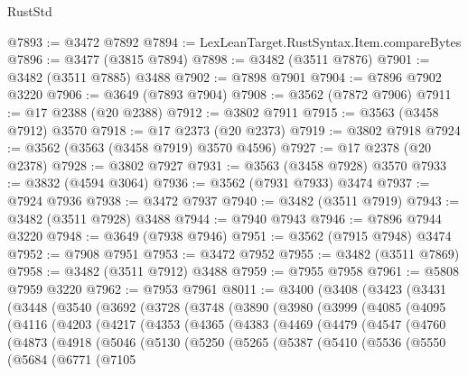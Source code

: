 \begin{lexlean}{RustStd}
\begin{coremodule}
@7893 := @3472 @7892
@7894 := LexLeanTarget.RustSyntax.Item.compareBytes
@7896 := @3477 (@3815 @7894)
@7898 := @3482 (@3511 @7876)
@7901 := @3482 (@3511 @7885) @3488
@7902 := @7898 @7901
@7904 := @7896 @7902 @3220
@7906 := @3649 (@7893 @7904)
@7908 := @3562 (@7872 @7906)
@7911 := @17 @2388 (@20 @2388)
@7912 := @3802 @7911
@7915 := @3563 (@3458 @7912) @3570
@7918 := @17 @2373 (@20 @2373)
@7919 := @3802 @7918
@7924 := @3562 (@3563 (@3458 @7919) @3570 @4596)
@7927 := @17 @2378 (@20 @2378)
@7928 := @3802 @7927
@7931 := @3563 (@3458 @7928) @3570
@7933 := @3832 (@4594 @3064)
@7936 := @3562 (@7931 @7933) @3474
@7937 := @7924 @7936
@7938 := @3472 @7937
@7940 := @3482 (@3511 @7919)
@7943 := @3482 (@3511 @7928) @3488
@7944 := @7940 @7943
@7946 := @7896 @7944 @3220
@7948 := @3649 (@7938 @7946)
@7951 := @3562 (@7915 @7948) @3474
@7952 := @7908 @7951
@7953 := @3472 @7952
@7955 := @3482 (@3511 @7869)
@7958 := @3482 (@3511 @7912) @3488
@7959 := @7955 @7958
@7961 := @5808 @7959 @3220
@7962 := @7953 @7961
@8011 := @3400
    (@3408
      (@3423
        (@3431
          (@3448
            (@3540
              (@3692
                (@3728
                  (@3748
                    (@3890
                      (@3980
                        (@3999
                          (@4085
                            (@4095
                              (@4116
                                (@4203
                                  (@4217
                                    (@4353
                                      (@4365
                                        (@4383
                                          (@4469
                                            (@4479
                                              (@4547
                                                (@4760
                                                  (@4873
                                                    (@4918
                                                      (@5046
                                                        (@5130
                                                          (@5250
                                                            (@5265
                                                              (@5387
                                                                (@5410
                                                                  (@5536
                                                                    (@5550
                                                                      (@5684
                                                                        (@6771
                                                                          (@7105

\end{coremodule}
\end{lexlean}
